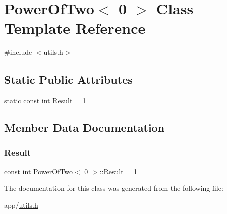 \hypertarget{class_power_of_two_3_010_01_4}{}\section{Power\+Of\+Two$<$ 0 $>$ Class Template Reference}
\label{class_power_of_two_3_010_01_4}


{\ttfamily \#include $<$utils.\+h$>$}

\subsection*{Static Public Attributes}
\begin{DoxyCompactItemize}
\item 
static const int \hyperlink{class_power_of_two_3_010_01_4_a5f4e473a60ab5b3859b92b45835a71cd}{Result} = 1
\end{DoxyCompactItemize}


\subsection{Member Data Documentation}
\hypertarget{class_power_of_two_3_010_01_4_a5f4e473a60ab5b3859b92b45835a71cd}{}\label{class_power_of_two_3_010_01_4_a5f4e473a60ab5b3859b92b45835a71cd} 
\subsubsection{\texorpdfstring{Result}{Result}}
{\footnotesize\ttfamily const int \hyperlink{class_power_of_two}{Power\+Of\+Two}$<$ 0 $>$\+::Result = 1\hspace{0.3cm}{\ttfamily [static]}}



The documentation for this class was generated from the following file\+:\begin{DoxyCompactItemize}
\item 
app/\hyperlink{utils_8h}{utils.\+h}\end{DoxyCompactItemize}
